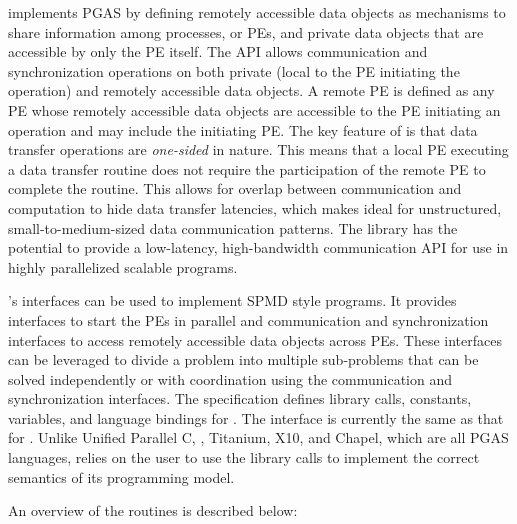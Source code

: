 \openshmem implements \ac{PGAS} by defining remotely accessible data objects as
mechanisms to share information among \openshmem processes, or \acp{PE}, and
private data objects that are accessible by only the \ac{PE} itself. The \ac{API}
allows communication and synchronization operations on both private (local to
the \ac{PE} initiating the operation) and remotely accessible data objects. A
remote \ac{PE} is defined as any \ac{PE} whose remotely accessible data objects
are accessible to the \ac{PE} initiating an operation and may include the
initiating \ac{PE}. The key
feature of \openshmem is that data transfer operations are
\emph{one-sided} in nature. This means that a local \ac{PE} executing
a data transfer routine does not require the participation of the remote \ac{PE}
to complete the routine. This allows for overlap between communication and
computation to hide data transfer latencies, which makes  \openshmem ideal for
unstructured, small-to-medium-sized data communication patterns. The \openshmem
library has the potential to provide a low-latency, high-bandwidth
communication \ac{API} for use in highly parallelized scalable programs.

\openshmem's interfaces can be used to implement \ac{SPMD} style programs.
It provides interfaces to start the \openshmem \acp{PE} in parallel and
communication and synchronization interfaces to access remotely accessible data
objects across \acp{PE}. These interfaces can be leveraged to divide a problem
into multiple sub-problems that can be solved independently or with coordination
using the communication and synchronization interfaces.  The \openshmem
specification defines library calls, constants, variables, and language bindings
for \Cstd.
The \Cpp interface is currently the same as that
for \Cstd. Unlike Unified Parallel C, \Fortran[2008], Titanium, X10, and Chapel, which are all
PGAS languages, \openshmem relies on the user to use the library calls  to
implement the correct semantics of its programming model.

An overview of the \openshmem routines is described below:

